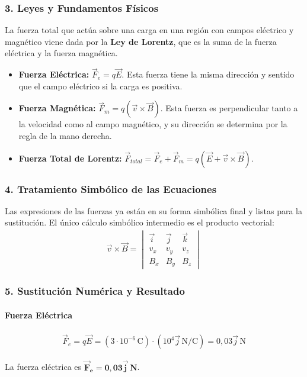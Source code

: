 \subsubsection*{3. Leyes y Fundamentos Físicos}
La fuerza total que actúa sobre una carga en una región con campos eléctrico y magnético viene dada por la \textbf{Ley de Lorentz}, que es la suma de la fuerza eléctrica y la fuerza magnética.
\begin{itemize}
    \item \textbf{Fuerza Eléctrica:} $\vec{F}_e = q\vec{E}$. Esta fuerza tiene la misma dirección y sentido que el campo eléctrico si la carga es positiva.
    \item \textbf{Fuerza Magnética:} $\vec{F}_m = q(\vec{v} \times \vec{B})$. Esta fuerza es perpendicular tanto a la velocidad como al campo magnético, y su dirección se determina por la regla de la mano derecha.
    \item \textbf{Fuerza Total de Lorentz:} $\vec{F}_{total} = \vec{F}_e + \vec{F}_m = q(\vec{E} + \vec{v} \times \vec{B})$.
\end{itemize}

\subsubsection*{4. Tratamiento Simbólico de las Ecuaciones}
Las expresiones de las fuerzas ya están en su forma simbólica final y listas para la sustitución. El único cálculo simbólico intermedio es el producto vectorial:
\begin{gather}
    \vec{v} \times \vec{B} = 
    \begin{vmatrix}
        \vec{i} & \vec{j} & \vec{k} \\
        v_x & v_y & v_z \\
        B_x & B_y & B_z
    \end{vmatrix}
\end{gather}

\subsubsection*{5. Sustitución Numérica y Resultado}
\paragraph*{Fuerza Eléctrica}
\begin{gather}
    \vec{F}_e = q\vec{E} = (3 \cdot 10^{-6}\,\text{C}) \cdot (10^4 \vec{j}\,\text{N/C}) = 0,03 \vec{j} \, \text{N}
\end{gather}
\begin{cajaresultado}
    La fuerza eléctrica es $\boldsymbol{\vec{F}_e = 0,03 \vec{j} \, \textbf{N}}$.
\end{cajaresultado}
